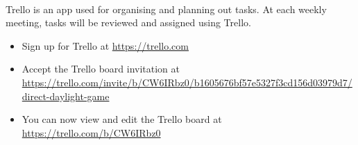 \documentclass[11pt]{article}
\begin{document}
\paragraph{}
Trello is an app used for organising and planning out tasks. At each weekly meeting, tasks will be reviewed and assigned using Trello.
\begin{itemize}
\item Sign up for Trello at \url{https://trello.com}
\item Accept the Trello board invitation at \\ \url{https://trello.com/invite/b/CW6IRbz0/b1605676bf57e5327f3cd156d03979d7/direct-daylight-game}
\item You can now view and edit the Trello board at \url{https://trello.com/b/CW6IRbz0}
\end{itemize}
\end{document}
